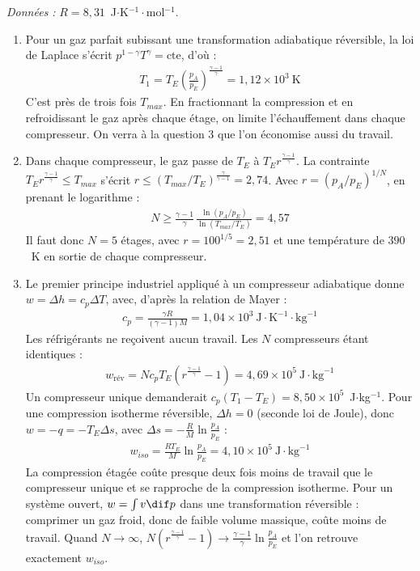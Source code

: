 \textit{Données :} $R=8{,}31$~J$\cdot$K$^{-1}\cdot$mol$^{-1}$.

\newpage

\begin{correction}

\begin{enumerate}

	\item Pour un gaz parfait subissant une transformation adiabatique réversible, la loi de Laplace s'écrit $p^{1-\gamma}T^{\gamma}=\text{cte}$, d'où :
	\begin{align*}
		\boxed{T_1=T_E\left(\frac{p_A}{p_E}\right)^{\frac{\gamma-1}{\gamma}}}=1{,}12\times10^{3}~\text{K}
	\end{align*}
	C'est près de trois fois $T_{max}$. En fractionnant la compression et en refroidissant le gaz après chaque étage, on limite l'échauffement dans chaque compresseur. On verra à la question 3 que l'on économise aussi du travail.

	\item Dans chaque compresseur, le gaz passe de $T_E$ à $T_Er^{\frac{\gamma-1}{\gamma}}$. La contrainte $T_Er^{\frac{\gamma-1}{\gamma}}\leqslant T_{max}$ s'écrit $r\leqslant\left(T_{max}/T_E\right)^{\frac{\gamma}{\gamma-1}}=2{,}74$. Avec $r=(p_A/p_E)^{1/N}$, en prenant le logarithme :
	\begin{align*}
		\boxed{N\geqslant\frac{\gamma-1}{\gamma}\,\frac{\ln(p_A/p_E)}{\ln(T_{max}/T_E)}}=4{,}57
	\end{align*}
	Il faut donc $N=5$ étages, avec $r=100^{1/5}=2{,}51$ et une température de $390$~K en sortie de chaque compresseur.

	\item Le premier principe industriel appliqué à un compresseur adiabatique donne $w=\Delta h=c_p\Delta T$, avec, d'après la relation de Mayer :
	\begin{align*}
		c_p=\frac{\gamma R}{(\gamma-1)M}=1{,}04\times10^{3}~\text{J}\cdot\text{K}^{-1}\cdot\text{kg}^{-1}
	\end{align*}
	Les réfrigérants ne reçoivent aucun travail. Les $N$ compresseurs étant identiques :
	\begin{align*}
		\boxed{w_{\text{rév}}=Nc_pT_E\left(r^{\frac{\gamma-1}{\gamma}}-1\right)}=4{,}69\times10^{5}~\text{J}\cdot\text{kg}^{-1}
	\end{align*}
	Un compresseur unique demanderait $c_p(T_1-T_E)=8{,}50\times10^{5}$~J$\cdot$kg$^{-1}$. Pour une compression isotherme réversible, $\Delta h=0$ (seconde loi de Joule), donc $w=-q=-T_E\Delta s$, avec $\Delta s=-\frac{R}{M}\ln\frac{p_A}{p_E}$ :
	\begin{align*}
		w_{iso}=\frac{RT_E}{M}\ln\frac{p_A}{p_E}=4{,}10\times10^{5}~\text{J}\cdot\text{kg}^{-1}
	\end{align*}
	La compression étagée coûte presque deux fois moins de travail que le compresseur unique et se rapproche de la compression isotherme. Pour un système ouvert, $w=\int v\dif p$ dans une transformation réversible : comprimer un gaz froid, donc de faible volume massique, coûte moins de travail. Quand $N\to\infty$, $N\left(r^{\frac{\gamma-1}{\gamma}}-1\right)\to\frac{\gamma-1}{\gamma}\ln\frac{p_A}{p_E}$ et l'on retrouve exactement $w_{iso}$.


\end{enumerate}
\end{correction}
